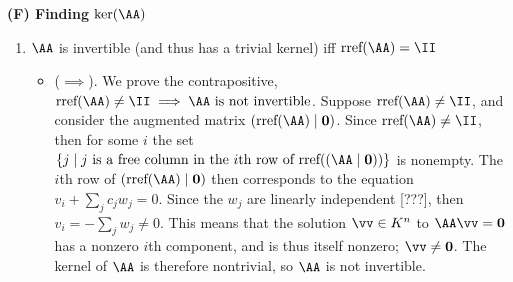 \textbf{(F) Finding $\ker(\AA)$}
\begin{enumerate}    
    \item $\AA$ is invertible (and thus has a trivial kernel) iff $\rref(\AA) = \II$
    \begin{itemize}
        \item    
        ($\implies$). We prove the contrapositive, $\rref(\AA) \neq \II \implies \text{$\AA$ is not invertible}$. Suppose $\rref(\AA) \neq \II$, and consider the augmented matrix $(\rref(\AA) \mid \mathbf{0})$. Since $\rref(\AA) \neq \II$, then for some $i$ the set $\{j \mid \text{$j$ is a free column in the $i$th row of $\rref((\AA \mid \mathbf{0}))$}\}$ is nonempty. The $i$th row of $(\rref(\AA) \mid \mathbf{0})$ then corresponds to the equation $v_i + \sum_j c_j w_j = 0$. Since the $w_j$ are linearly independent [???], then $v_i = -\sum_j w_j \neq 0$. This means that the solution $\vv \in K^n$ to $\AA \vv = \mathbf{0}$ has a nonzero $i$th component, and is thus itself nonzero; $\vv \neq \mathbf{0}$. The kernel of $\AA$ is therefore nontrivial, so $\AA$ is not invertible. 


\end{itemize}
\end{enumerate}
